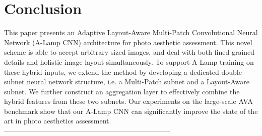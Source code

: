 \documentclass[10pt,twocolumn,letterpaper]{article}
\begin{document}
\section{Conclusion}
This paper presents an Adaptive Layout-Aware Multi-Patch Convolutional Neural Network (A-Lamp CNN) architecture for photo aesthetic assessment. This novel scheme is able to accept arbitrary sized images, and deal with both fined grained details and holistic image layout simultaneously. To support A-Lamp training on these hybrid inputs, we extend the method by developing a dedicated double-subnet neural network structure, i.e. a Multi-Patch subnet and a Layout-Aware subnet. We further construct an aggregation layer to effectively combine the hybrid features from these two subnets. Our experiments on the large-scale AVA benchmark show that our A-Lamp CNN can significantly improve the state of the art in photo aesthetics assessment.
-----------------------------------------------------------------------

{\small
	
	
}
\end{document}
